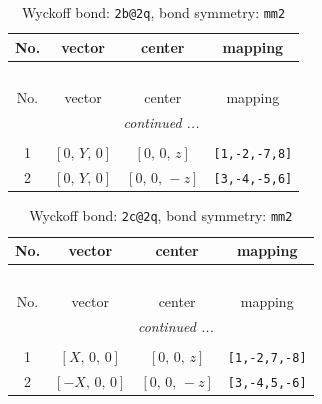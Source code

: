 \documentclass[fleqn,8pt]{jsarticle}
\begin{document}
\renewcommand{\arraystretch}{1.2}
\begin{longtable}{cccc}
\caption{Wyckoff bond: {\tt 2b@2q}, bond symmetry: {\tt mm2}}
 \\
 \hline \hline
No. & vector & center & mapping \\ \hline \endfirsthead

\multicolumn{3}{l}{\tablename\ \thetable{}} \\
 \hline \hline
No. & vector & center & mapping \\ \hline \endhead

 \hline \hline
\multicolumn{3}{r}{\footnotesize\it continued ...} \\ \endfoot

 \hline \hline
\multicolumn{3}{r}{} \\ \endlastfoot

1 & $\left[ 0,\, Y,\, 0 \right]$ & $\left[ 0,\, 0,\, z \right]$ & {\tt [1,-2,-7,8]} \\ \hline
2 & $\left[ 0,\, Y,\, 0 \right]$ & $\left[ 0,\, 0,\, - z \right]$ & {\tt [3,-4,-5,6]} \\
\end{longtable}
\renewcommand{\arraystretch}{1.2}
\begin{longtable}{cccc}
\caption{Wyckoff bond: {\tt 2c@2q}, bond symmetry: {\tt mm2}}
 \\
 \hline \hline
No. & vector & center & mapping \\ \hline \endfirsthead

\multicolumn{3}{l}{\tablename\ \thetable{}} \\
 \hline \hline
No. & vector & center & mapping \\ \hline \endhead

 \hline \hline
\multicolumn{3}{r}{\footnotesize\it continued ...} \\ \endfoot

 \hline \hline
\multicolumn{3}{r}{} \\ \endlastfoot

1 & $\left[ X,\, 0,\, 0 \right]$ & $\left[ 0,\, 0,\, z \right]$ & {\tt [1,-2,7,-8]} \\ \hline
2 & $\left[ - X,\, 0,\, 0 \right]$ & $\left[ 0,\, 0,\, - z \right]$ & {\tt [3,-4,5,-6]} \\
\end{longtable}
\renewcommand{\arraystretch}{1.2}
\end{document}
